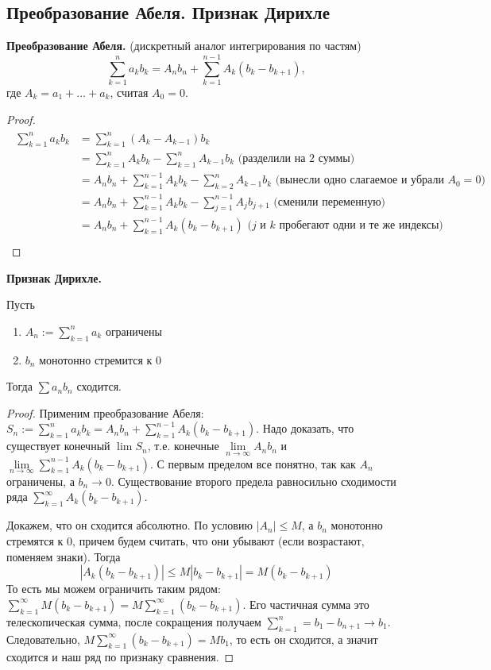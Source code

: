 \subsection{Преобразование Абеля. Признак Дирихле}
\textbf{Преобразование Абеля.} (дискретный аналог интегрирования по частям) \[ \sum_{k = 1}^n a_kb_k = A_nb_n + \sum_{k = 1}^{n - 1} A_k(b_k - b_{k+1}), \] где $A_k = a_1 + \dots + a_k$, считая $A_0 = 0$.
\begin{proof}
    \begin{gather*}
        \begin{split}
            \sum_{k = 1}^n a_kb_k &= \sum_{k = 1}^n (A_k - A_{k-1})b_k \\
            &= \sum_{k = 1}^n A_kb_k - \sum_{k = 1}^n A_{k-1}b_k \text{ (разделили на 2 суммы)} \\
            &= A_nb_n + \sum_{k = 1}^{n-1} A_kb_k - \sum_{k = 2}^n A_{k-1}b_k \text{ (вынесли одно слагаемое и убрали $A_0 = 0$)} \\
            &= A_nb_n + \sum_{k = 1}^{n-1} A_kb_k - \sum_{j = 1}^{n-1} A_jb_{j+1} \text{ (сменили переменную)} \\
            &= A_nb_n + \sum_{k = 1}^{n-1} A_k(b_k - b_{k+1}) \text{ ($j$ и $k$ пробегают одни и те же индексы)} \\
        \end{split}
    \end{gather*}
\end{proof} 

\textbf{Признак Дирихле.} 

 Пусть \begin{enumerate}
    \item $A_n := \sum\limits_{k = 1}^n a_k$ ограничены
    \item $b_n$ монотонно стремится к 0
\end{enumerate}
Тогда $\sum a_nb_n$ сходится.
\begin{proof}
    Применим преобразование Абеля: $S_n := \sum\limits_{k=1}^n a_kb_k = A_nb_n + \sum\limits_{k=1}^{n-1} A_k(b_k - b_{k+1})$.
    \quad Надо доказать, что существует конечный $\lim S_n$, т.е. конечные $\lim\limits_{n \to \infty} A_nb_n$ и $\lim\limits_{n \to \infty} \sum\limits_{k=1}^{n-1} A_k(b_k - b_{k+1})$.
    С первым пределом все понятно, так как $A_n$ ограничены, а $b_n \to 0$.
    Существование второго предела равносильно сходимости ряда $\sum\limits_{k=1}^{\infty} A_k(b_k - b_{k+1})$.

    \quad Докажем, что он сходится абсолютно. 
    По условию $|A_n| \leqslant M$, а $b_n$ монотонно стремятся к 0, причем будем считать, что они убывают (если возрастают, поменяем знаки).
    Тогда \[ |A_k(b_k - b_{k+1})| \leqslant M|b_k - b_{k+1}| = M(b_k - b_{k+1}) \]
    \quad То есть мы можем ограничить таким рядом: $ \sum\limits_{k=1}^{\infty} M(b_k - b_{k+1}) = M\sum\limits_{k=1}^{\infty} (b_k - b_{k+1}) $. 
    Его частичная сумма это телескопическая сумма, после сокращения получаем $\sum\limits_{k=1}^{n} = b_1 - b_{n+1} \to b_1$.
    Следовательно, $M\sum\limits_{k=1}^{\infty} (b_k - b_{k+1}) = Mb_1$, то есть он сходится, а значит сходится и наш ряд по признаку сравнения.
\end{proof}
